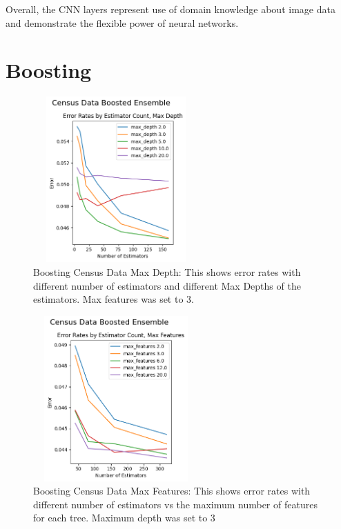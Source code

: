 \documentclass[letterpaper]{article} %
\begin{document}
Overall, the CNN layers represent use of domain knowledge about image data and demonstrate the flexible power of neural networks.  

\section{Boosting}

\begin{figure}[h]
\centering
\includegraphics[width=2.5in, height=2.5in]{figures/Census_Data_Boosting_Estimator_Count_by_Max_Depth_boosting_1.png}
\caption{Boosting Census Data Max Depth:  This shows error rates with different number of estimators and different Max Depths of the estimators.  Max features was set to 3. }
\label{fig:boosting_census_1}
\end{figure}

\begin{figure}[h]
\centering
\includegraphics[width=2.5in, height=2.5in]{figures/Census_Data_Boosting_Estimator_Count_by_Max_Depth_boosting_2.png}
\caption{Boosting Census Data Max Features:  This shows error rates with different number of estimators vs the maximum number of features for each tree. Maximum depth was set to 3  }
\label{fig:boosting_census_2}
\end{figure}
\end{document}
